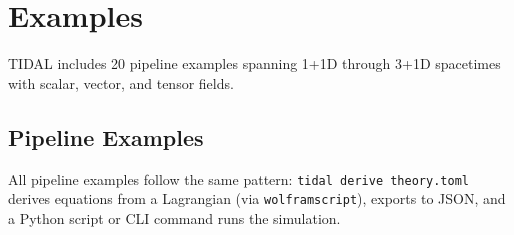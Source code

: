 
\section{Examples}
\label{sec:examples}

TIDAL includes 20 pipeline examples spanning 1+1D through 3+1D spacetimes with scalar, vector, and tensor fields.

\subsection{Pipeline Examples}

All pipeline examples follow the same pattern: \texttt{tidal derive theory.toml} derives equations from a Lagrangian (via \texttt{wolframscript}), exports to JSON, and a Python script or CLI command runs the simulation.

